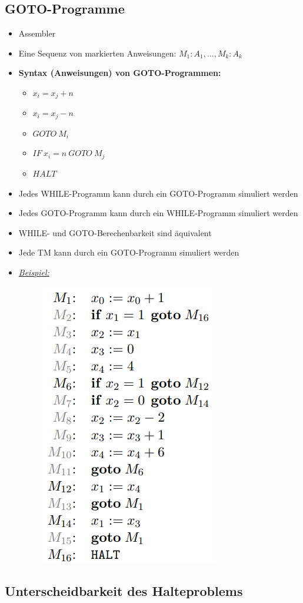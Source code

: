 \documentclass[ieeetran]{article}
\begin{document}
\subsection{GOTO-Programme} %
\label{sub:gOTO_programe}
\begin{itemize}
  \item Assembler
\item Eine Sequenz von markierten Anweisungen: $M_1:A_1, \ldots, M_k:A_k$
\item \textbf{Syntax (Anweisungen) von GOTO-Programmen:}
	\begin{itemize}
		\item $x_i = x_j + n$
	\item $x_i = x_j - n$
	\item $GOTO \ M_i$
	\item $IF \ x_i = n \ GOTO \ M_j$
	\item $HALT$
	\end{itemize}

\item Jedes WHILE-Programm kann durch ein GOTO-Programm simuliert werden
\item Jedes GOTO-Programm kann durch ein WHILE-Programm simuliert werden
\item WHILE- und GOTO-Berechenbarkeit sind äquivalent

\item Jede TM kann durch ein GOTO-Programm simuliert werden

\item \textit{\underline{Beispiel:}}
	\begin{figure}[h!]
	  \centering
	  \includegraphics[width=0.2\linewidth]{gotoexample}
	  \label{fig:gotoexample}
	\end{figure}
\end{itemize}

\subsection{Unterscheidbarkeit des Halteproblems} %
\label{sub:unterscheidbarkeit_des_halteproblems}
\end{document}
